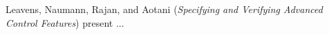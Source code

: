 

Leavens, Naumann, Rajan, and Aotani
\cite{isola-2016-leavens}
({\em Specifying and Verifying Advanced Control Features})
present ...

